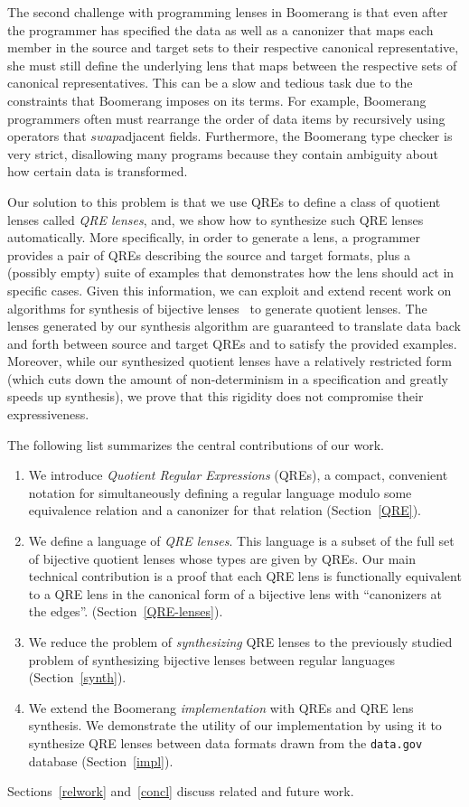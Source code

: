 \documentclass[acmsmall,review,anonymous]{acmart}
\newcommand{\kw}[1]{\ensuremath{\mathit{#1}}}
\newcommand{\swap}{\ensuremath{\kw{swap}}}
\begin{document}
The second challenge with programming lenses in Boomerang is that even after the
programmer has specified the data as well as a canonizer that maps each member
in the source and target sets to their respective canonical representative, she
must still define the underlying lens that maps between the respective sets of
canonical representatives. This can be a slow and tedious task due to the
constraints that Boomerang imposes on its terms. For example, Boomerang
programmers often must rearrange the order of data items by recursively using
operators that \swap adjacent fields. Furthermore, the Boomerang type checker is
very strict, disallowing many programs because they contain ambiguity about how
certain data is transformed.

Our solution to this problem is that we use QREs to define a class of quotient
lenses called {\em QRE lenses}, and, we show how to synthesize such QRE lenses
automatically. More specifically, in order to generate a lens, a programmer
provides a pair of QREs describing the source and target formats, plus
a (possibly empty) suite of examples that demonstrates how the
lens should act in specific cases.  Given this information, we can exploit and
extend recent work on algorithms for synthesis of bijective
lenses~\cite{optician} to generate quotient lenses. The lenses generated by
our synthesis algorithm are guaranteed to translate data back and forth
between source and target QREs and to satisfy the provided examples.
Moreover, while our synthesized quotient lenses have a relatively
restricted form (which cuts down the amount of non-determinism in
a specification and greatly speeds up synthesis), we prove that
this rigidity does not compromise their expressiveness.

The following list summarizes the central contributions of our work.
\begin{enumerate}
  \item We introduce {\em Quotient Regular Expressions} (QREs),
  a compact, convenient notation for simultaneously defining a
  regular language modulo some equivalence relation and a canonizer
  for that relation (Section~\ref{QRE}).
  \item We define a language of {\em QRE lenses}.  This language is
  a subset of the full set of bijective quotient
  lenses whose types are given by QREs. Our main technical contribution
  is a proof that each QRE lens is functionally equivalent to a QRE lens in the
  canonical form of a bijective lens with ``canonizers at the edges''.
   (Section~\ref{QRE-lenses}).
  \item We reduce the problem of {\em synthesizing}
  QRE lenses to the previously studied problem of synthesizing bijective lenses
  between regular languages (Section~\ref{synth}).
  \item We extend the Boomerang {\em implementation} with QREs
  and QRE lens synthesis.  We demonstrate the utility of our
  implementation by using it to
  synthesize QRE lenses between data formats drawn from the
  {\tt data.gov} database (Section~\ref{impl}).
\end{enumerate}
Sections~\ref{relwork} and~\ref{concl} discuss related and future work.
\end{document}
